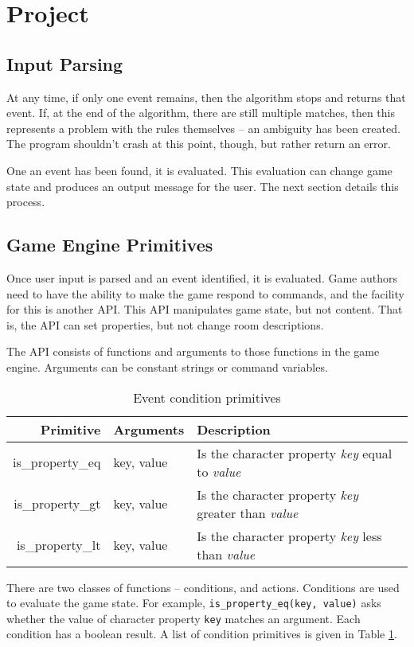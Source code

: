 \documentclass{article}
\newcommand{\enterProblemHeader}[1]{
}
\newcommand{\exitProblemHeader}[1]{
\nobreak\extramarks{#1}{}\nobreak
}
\newcounter{homeworkProblemCounter} %
\newcommand{\homeworkProblemName}{}
\newenvironment{homeworkProblem}[1][Problem \arabic{homeworkProblemCounter}]{ %
\stepcounter{homeworkProblemCounter} %
\renewcommand{\homeworkProblemName}{#1} %
\section{\homeworkProblemName} %
\enterProblemHeader{\homeworkProblemName} %
}{
\exitProblemHeader{\homeworkProblemName} %
}
\newcommand{\homeworkSectionName}{}
\newenvironment{homeworkSection}[1]{ %
\renewcommand{\homeworkSectionName}{#1} %
\subsection{\homeworkSectionName} %
\enterProblemHeader{\homeworkProblemName\ [\homeworkSectionName]} %
}{
\enterProblemHeader{\homeworkProblemName} %
}
\begin{document}
\begin{homeworkProblem}[Project]
\begin{homeworkSection}{Input Parsing}
	At any time, if only one event remains, then the algorithm stops and returns that event. If, at the end of the algorithm, there are still multiple matches, then this represents a problem with the rules themselves -- an ambiguity has been created. The program shouldn't crash at this point, though, but rather return an error.

	One an event has been found, it is evaluated. This evaluation can change game state and produces an output message for the user. The next section details this process.

\end{homeworkSection}

\begin{homeworkSection}{Game Engine Primitives}
	Once user input is parsed and an event identified, it is evaluated. Game authors need to have the ability to make the game respond to commands, and the facility for this is another API. This API manipulates game state, but not content. That is, the API can set properties, but not change room descriptions.

	The API consists of functions and arguments to those functions in the game engine. Arguments can be constant strings or command variables.

	\begin{table}
		\begin{tabularx}{\textwidth}{|r|l|X|}
			\hline
			Primitive & Arguments & Description \\
			\hline \hline
			is\_property\_eq & key, value & Is the character property \textit{key} equal to \textit{value} \\
			is\_property\_gt & key, value & Is the character property \textit{key} greater than \textit{value} \\
			is\_property\_lt & key, value & Is the character property \textit{key} less than \textit{value} \\
			\hline
		\end{tabularx}
		\caption{Event condition primitives}
		\label{tab:event-condition-primitives}
	\end{table}

	There are two classes of functions -- conditions, and actions. Conditions are used to evaluate the game state. For example, \texttt{is\_property\_eq(key, value)} asks whether the value of character property \texttt{key} matches an argument. Each condition has a boolean result. A list of condition primitives is given in Table \ref{tab:event-condition-primitives}.
	

\end{homeworkSection}
\end{homeworkProblem}
\end{document}
